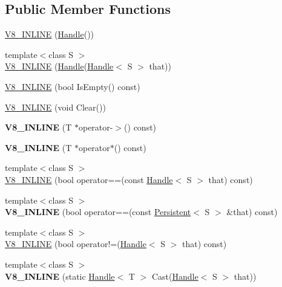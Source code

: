 \subsection*{Public Member Functions}
\begin{DoxyCompactItemize}
\item 
\hyperlink{classv8_1_1_handle_a0005cb917206b7e4800d19d4eca68e21}{V8\+\_\+\+I\+N\+L\+I\+N\+E} (\hyperlink{classv8_1_1_handle}{Handle}())
\item 
{\footnotesize template$<$class S $>$ }\\\hyperlink{classv8_1_1_handle_a947012938048fb8159ccdeb63b3e6a0f}{V8\+\_\+\+I\+N\+L\+I\+N\+E} (\hyperlink{classv8_1_1_handle}{Handle}(\hyperlink{classv8_1_1_handle}{Handle}$<$ S $>$ that))
\item 
\hyperlink{classv8_1_1_handle_a77848ecb0ef455dfd0d6c70b469f44d9}{V8\+\_\+\+I\+N\+L\+I\+N\+E} (bool Is\+Empty() const)
\item 
\hyperlink{classv8_1_1_handle_ad2464f7c221a91e14caa0343312e36f9}{V8\+\_\+\+I\+N\+L\+I\+N\+E} (void Clear())
\item 
\hypertarget{classv8_1_1_handle_ad0580b75ccf7af4cfb74b5e5c1bfb2fd}{}{\bfseries V8\+\_\+\+I\+N\+L\+I\+N\+E} (T $\ast$operator-\/$>$() const)\label{classv8_1_1_handle_ad0580b75ccf7af4cfb74b5e5c1bfb2fd}

\item 
\hypertarget{classv8_1_1_handle_aad1d16e28c0e6941172dc9dd24d3617a}{}{\bfseries V8\+\_\+\+I\+N\+L\+I\+N\+E} (T $\ast$operator$\ast$() const)\label{classv8_1_1_handle_aad1d16e28c0e6941172dc9dd24d3617a}

\item 
{\footnotesize template$<$class S $>$ }\\\hyperlink{classv8_1_1_handle_a00fd33d905ad71ac52982a7944600fa0}{V8\+\_\+\+I\+N\+L\+I\+N\+E} (bool operator==(const \hyperlink{classv8_1_1_handle}{Handle}$<$ S $>$ that) const)
\item 
\hypertarget{classv8_1_1_handle_a0fefa305c90785ce2bb5dbfb955e55ca}{}{\footnotesize template$<$class S $>$ }\\{\bfseries V8\+\_\+\+I\+N\+L\+I\+N\+E} (bool operator==(const \hyperlink{classv8_1_1_persistent}{Persistent}$<$ S $>$ \&that) const)\label{classv8_1_1_handle_a0fefa305c90785ce2bb5dbfb955e55ca}

\item 
{\footnotesize template$<$class S $>$ }\\\hyperlink{classv8_1_1_handle_a85f5fb0108672950759ccc99cc8348a8}{V8\+\_\+\+I\+N\+L\+I\+N\+E} (bool operator!=(\hyperlink{classv8_1_1_handle}{Handle}$<$ S $>$ that) const)
\item 
\hypertarget{classv8_1_1_handle_a7a264b2c3e58c4003f5968a7c0ef347e}{}{\footnotesize template$<$class S $>$ }\\{\bfseries V8\+\_\+\+I\+N\+L\+I\+N\+E} (static \hyperlink{classv8_1_1_handle}{Handle}$<$ T $>$ Cast(\hyperlink{classv8_1_1_handle}{Handle}$<$ S $>$ that))\label{classv8_1_1_handle_a7a264b2c3e58c4003f5968a7c0ef347e}


\end{DoxyCompactItemize}
